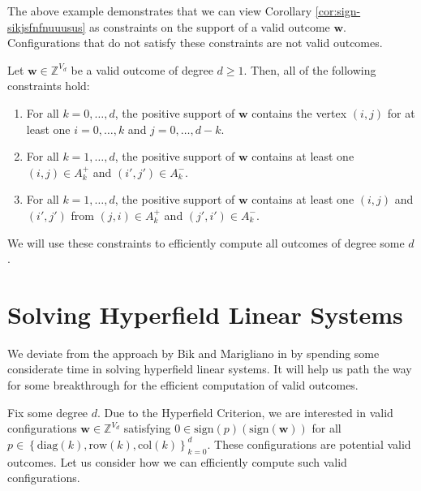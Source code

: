 The above example demonstrates that we can view Corollary \ref{cor:sign-sikjsfnfnuuusus} as constraints on the support of a valid outcome \( \mathbf{w} \). Configurations that do not satisfy these constraints are not valid outcomes.

\begin{corollary}\label{cor:sdnfksjnjkwnrw3r}
    Let \( \mathbf{w} \in \mathbb{Z}^{V_d} \) be a valid outcome of degree \( d \geq 1 \). Then, all of the following constraints hold:
    \begin{enumerate}
        \item For all \( k = 0, \dots, d \), the positive support of \( \mathbf{w} \) contains the vertex \( (i,j) \) for at least one \( i = 0, \dots, k \) and \( j = 0, \dots, d - k \).
        \item For all \( k = 1, \dots, d \), the positive support of \( \mathbf{w} \) contains at least one \( (i,j) \in A_k^+ \) and \( (i',j') \in A_k^- \).
        \item For all \( k = 1, \dots, d \), the positive support of \( \mathbf{w} \) contains at least one \( (i,j) \) and \( (i',j') \) from \( (j,i) \in A_k^+ \) and \( (j',i') \in A_k^- \).
    \end{enumerate}
\end{corollary}

We will use these constraints to efficiently compute all outcomes of degree some \( d \).

\section{Solving Hyperfield Linear Systems}

We deviate from the approach by Bik and Marigliano in \cite{bik2022classifying} by spending some considerate time in solving hyperfield linear systems. It will help us path the way for some breakthrough for the efficient computation of valid outcomes.

Fix some degree \( d \). Due to the Hyperfield Criterion, we are interested in valid configurations \( \mathbf{w} \in \mathbb{Z}^{V_d} \) satisfying \( 0 \in \mathrm{sign}(p)(\mathrm{sign}(\mathbf{w})) \)
for all \( p \in \left\{ \mathrm{diag}(k), \mathrm{row}(k), \mathrm{col}(k) \right\}_{k=0}^d \). These configurations are potential valid outcomes. Let us consider how we can efficiently compute such valid configurations.

\vspace{0.3cm}

